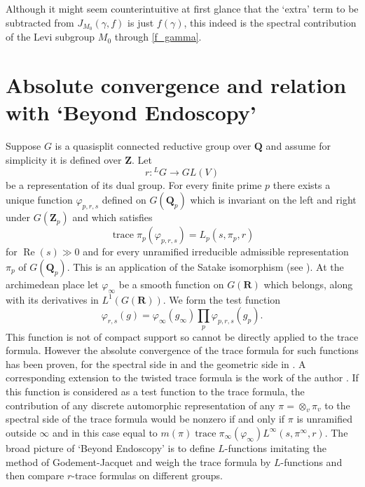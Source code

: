 \documentclass[11pt]{amsart}
\newcommand*\widefbox[1]{\fbox{\hspace{2em}#1\hspace{2em}}}
\def\Q{\mathbf Q}
\def\R{\mathbf R}
\def\Z{\mathbf Z}
\def\Lone{L^1}
\def\Re{\operatorname{Re}}
\def\trace{\operatorname{trace}}
\theoremstyle{remark}
\begin{document}

Although it might seem counterintuitive at first glance that the `extra' term to be subtracted from $J_{M_0}(\gamma, f)$ is just $f(\gamma)$, this indeed is the spectral contribution of the Levi subgroup $M_0$ through \cref{f_gamma}.



\section{Absolute convergence and relation with `Beyond Endoscopy'}

Suppose $G$ is a quasisplit connected reductive group over $\Q$ and assume for simplicity it is defined over $\Z$. Let
\[ r : {}^LG \to GL(V) \]
be a representation of its dual group. For every finite prime $p$ there exists a unique function $\varphi_{p, r, s}$ defined on $G(\Q_p)$ which is invariant on the left and right under $G(\Z_p)$ and which satisfies
\[ \trace \pi_p(\varphi_{p, r, s}) = L_p(s, \pi_p, r) \]
for $\Re(s) \gg 0$ and for every unramified irreducible admissible representation $\pi_p$ of $G(\Q_p)$. This is an application of the Satake isomorphism (see \cite{MR3220933}). At the archimedean place let $\varphi_\infty$ be a smooth function on $G(\R)$ which belongs, along with its derivatives in $\Lone(G(\R))$. We form the test function
\[ \varphi_{r, s}(g) = \varphi_\infty(g_\infty) \displaystyle\prod_p \varphi_{p, r, s}(g_p). \]
This function is not of compact support so cannot be directly applied to the trace formula. However the absolute convergence of the trace formula for such functions has been proven, for the spectral side in \cite{FLM} and the geometric side in \cite{FL16}. A corresponding extension to the twisted trace formula is the work of the author \cite{Par19}. If this function is considered as a test function to the trace formula, the contribution of any discrete automorphic representation of any $\pi = \otimes_v \pi_v$ to the spectral side of the trace formula would be nonzero if and only if $\pi$ is unramified outside $\infty$ and in this case equal to $m(\pi) \trace \pi_\infty(\varphi_\infty) L^\infty(s, \pi^\infty, r)$. The broad picture of `Beyond Endoscopy' is to define $L$-functions imitating the method of Godement-Jacquet and weigh the trace formula by $L$-functions and then compare $r$-trace formulas on different groups. \\
\end{document}
